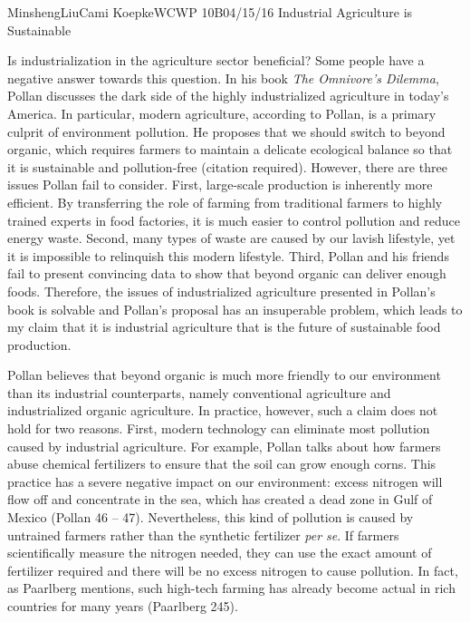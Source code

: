 \documentclass[12pt,letterpaper]{article}
\begin{document}
\begin{mla}{Minsheng}{Liu}{Cami Koepke}{WCWP 10B}{04/15/16}
  {Industrial Agriculture is Sustainable}

Is industrialization in the agriculture sector beneficial? Some people
have a negative answer towards this question. In his book \emph{The
Omnivore's Dilemma}, Pollan discusses the dark side of the highly
industrialized agriculture in today's America. In particular, modern
agriculture, according to Pollan, is a primary culprit of environment
pollution. He proposes that we should switch to beyond organic, which
requires farmers to maintain a delicate ecological balance so that it is
sustainable and pollution-free (citation required). However, there are
three issues Pollan fail to consider. First, large-scale production is
inherently more efficient. By transferring the role of farming from
traditional farmers to highly trained experts in food factories, it is
much easier to control pollution and reduce energy waste. Second, many
types of waste are caused by our lavish lifestyle, yet it is impossible
to relinquish this modern lifestyle. Third, Pollan and his friends fail
to present convincing data to show that beyond organic can deliver
enough foods. Therefore, the issues of industrialized agriculture
presented in Pollan's book is solvable and Pollan's proposal has an
insuperable problem, which leads to my claim that it is industrial
agriculture that is the future of sustainable food production.

Pollan believes that beyond organic is much more friendly to our
environment than its industrial counterparts, namely conventional
agriculture and industrialized organic agriculture. In practice,
however, such a claim does not hold for two reasons. First, modern
technology can eliminate most pollution caused by industrial
agriculture. For example, Pollan talks about how farmers abuse chemical
fertilizers to ensure that the soil can grow enough corns. This practice
has a severe negative impact on our environment: excess nitrogen will
flow off and concentrate in the sea, which has created a dead zone in
Gulf of Mexico (Pollan 46 -- 47). Nevertheless, this kind of pollution
is caused by untrained farmers rather than the synthetic fertilizer
\emph{per se}. If farmers scientifically measure the nitrogen needed,
they can use the exact amount of fertilizer required and there will be
no excess nitrogen to cause pollution. In fact, as Paarlberg mentions,
such high-tech farming has already become actual in rich countries for
many years (Paarlberg 245).


\end{mla}
\end{document}

